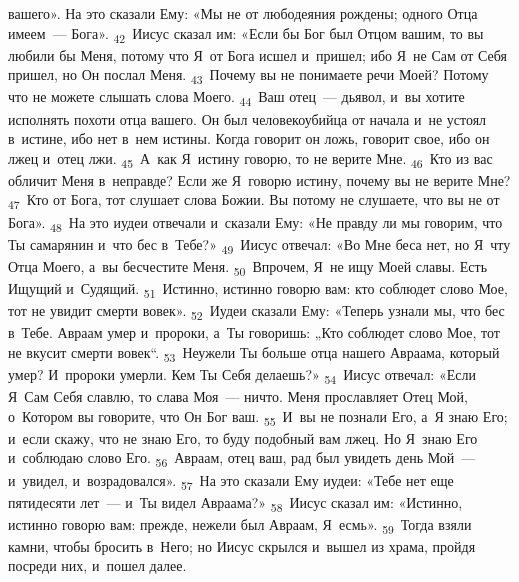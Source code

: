 \documentclass[a4paper,12pt]{article}
\begin{document}
вашего». На это сказали Ему: «Мы не от любодеяния рождены; одного Отца имеем~--- Бога». \textsubscript{42}~Иисус сказал им: «Если бы Бог был Отцом вашим, то вы любили бы Меня, потому что Я~от Бога исшел и~пришел; ибо Я~не Сам от Себя пришел, но Он послал Меня. \textsubscript{43}~Почему вы не понимаете речи Моей? Потому что не можете слышать слова Моего. \textsubscript{44}~Ваш отец~--- дьявол, и~вы хотите исполнять похоти отца вашего. Он был человекоубийца от начала и~не устоял в~истине, ибо нет в~нем истины. Когда говорит он ложь, говорит свое, ибо он лжец и~отец лжи. \textsubscript{45}~А~как Я~истину говорю, то не верите Мне. \textsubscript{46}~Кто из вас обличит Меня в~неправде? Если же Я~говорю истину, почему вы не верите Мне? \textsubscript{47}~Кто от Бога, тот слушает слова Божии. Вы потому не слушаете, что вы не от Бога». \textsubscript{48}~На это иудеи отвечали и~сказали Ему: «Не правду ли мы говорим, что Ты самарянин и~что бес в~Тебе?» \textsubscript{49}~Иисус отвечал: «Во Мне беса нет, но Я~чту Отца Моего, а~вы бесчестите Меня. \textsubscript{50}~Впрочем, Я~не ищу Моей славы. Есть Ищущий и~Судящий. \textsubscript{51}~Истинно, истинно говорю вам: кто соблюдет слово Мое, тот не увидит смерти вовек». \textsubscript{52}~Иудеи сказали Ему: «Теперь узнали мы, что бес в~Тебе. Авраам умер и~пророки, а~Ты говоришь: „Кто соблюдет слово Мое, тот не вкусит смерти вовек“. \textsubscript{53}~Неужели Ты больше отца нашего Авраама, который умер? И~пророки умерли. Кем Ты Себя делаешь?» \textsubscript{54}~Иисус отвечал: «Если Я~Сам Себя славлю, то слава Моя~--- ничто. Меня прославляет Отец Мой, о~Котором вы говорите, что Он Бог ваш. \textsubscript{55}~И~вы не познали Его, а~Я знаю Его; и~если скажу, что не знаю Его, то буду подобный вам лжец. Но Я~знаю Его и~соблюдаю слово Его. \textsubscript{56}~Авраам, отец ваш, рад был увидеть день Мой~--- и~увидел, и~возрадовался». \textsubscript{57}~На это сказали Ему иудеи: «Тебе нет еще пятидесяти лет~--- и~Ты видел Авраама?» \textsubscript{58}~Иисус сказал им: «Истинно, истинно говорю вам: прежде, нежели был Авраам, Я~есмь». \textsubscript{59}~Тогда взяли камни, чтобы бросить в~Него; но Иисус скрылся и~вышел из храма, пройдя посреди них, и~пошел далее. 
\end{document}
